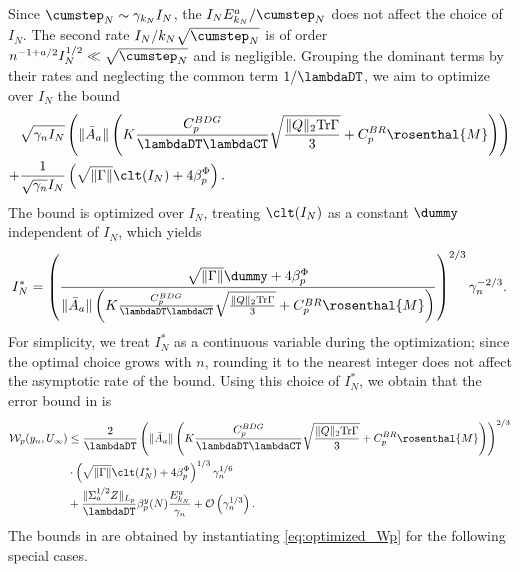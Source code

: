 \documentclass[11pt]{article}
\begin{document}
Since $\cumstep_N \sim \gamma_{k_N} I_N$, the $I_N E_{k_N}^a/\cumstep_N$ does not affect the choice of $I_N$. 
The second rate $I_N/k_N\sqrt{\cumstep_N}$ is of order $n^{-1 + a/2} I_N^{1/2} \ll \sqrt{\cumstep_N}$ and is negligible. 
Grouping the dominant terms by their rates and neglecting the common term $1/\lambdaDT$, we aim to optimize over $I_N$ the bound
\begin{equation}\label{eq:thm1_dominant_step2}
\begin{split}
    &\sqrt{\gamma_n I_N} \left(  \lVert \bar{A}_a \rVert \left(
    K\frac{C_p^{BDG}}{\lambdaDT \lambdaCT} \sqrt{\frac{\lVert Q \rVert_2\mathrm{Tr} \Gamma}{3}} 
    + C_p^{BR} \rosenthal{M}\right)\right)
    \\ + & 
    \frac{1}{\sqrt{\gamma_n} I_N} \left(\sqrt{\lVert \Gamma \rVert} \clt(I_N) + 4 \beta_p^{\Phi} \right)
    .         
\end{split}
\end{equation}
The bound is optimized over $I_N$, treating $\clt(I_N)$ as a constant $\dummy$ independent of $I_N$, which yields
\begin{equation}\label{eq:INstar}
    I_N^* = \left(\frac{\sqrt{\lVert \Gamma \rVert} \dummy  + 4 \beta_p^{\Phi}}{\lVert \bar{A}_a \rVert \left(K\frac{C_p^{BDG}}{\lambdaDT \lambdaCT} \sqrt{\frac{\lVert Q \rVert_2\mathrm{Tr} \Gamma}{3}}  + C_p^{BR} \rosenthal{M} \right)} \right)^{2/3} \gamma_n^{-2/3} .     
\end{equation}
For simplicity, we treat $I_N^*$ as a continuous variable during the optimization; since the optimal choice grows with $n$, rounding it to the nearest integer does not affect the asymptotic rate of the bound. 
Using this choice of $I_N^*$, we obtain that the error bound in  is 
\begin{equation}\label{eq:optimized_Wp}
\begin{split}
    \mathcal{W}_p (y_n, U_\infty) 
    &\leq
    \frac{2}{\lambdaDT} \left(\lVert \bar{A}_a \rVert \left(K\frac{C_p^{BDG}}{\lambdaDT \lambdaCT} \sqrt{\frac{\lVert Q \rVert_2\mathrm{Tr} \Gamma}{3}}  + C_p^{BR} \rosenthal{M} \right) \right)^{2/3}  
    \\ &
    \cdot \left( \sqrt{\lVert \Gamma \rVert} \clt(I_N^*) + 4 \beta_p^\Phi\right)^{1/3} \gamma_n^{1/6}
    \\ 
    &+
    \frac{\lVert \Sigma_a^{1/2}Z\rVert_{L_p}}{\lambdaDT} \beta_p^y (N) \frac{E_{k_N}^a}{\gamma_n}
    + 
    \mathcal{O}\left( \gamma_n^{1/3} \right).     
\end{split}
\end{equation}
The bounds in  are obtained by instantiating \eqref{eq:optimized_Wp} for the following special cases. 
\end{document}
